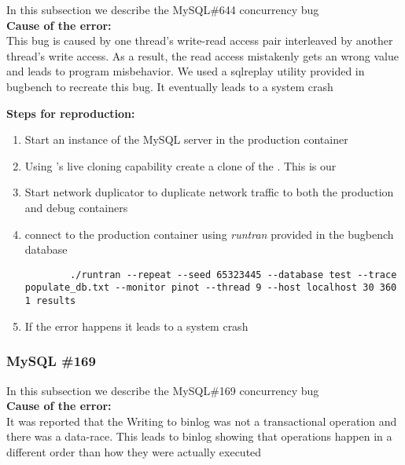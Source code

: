 In this subsection we describe the MySQL\#644 concurrency bug \\

\noindent \textbf{Cause of the error:} \\

This bug is caused by one thread's write-read access pair interleaved by another thread's write access. 
As a result, the read access mistakenly gets an wrong value and leads to program misbehavior.
We used a sqlreplay utility provided in bugbench to recreate this bug. It eventually leads to a system crash

\noindent \textbf{Steps for reproduction:} \\

\begin{adjustwidth}{0.5cm}{}
	\begin{enumerate}
		\item Start an instance of the MySQL server in the production container
		\item Using \parikshan's live cloning capability create a clone of the \productioncontainer. This is our \debugcontainer
		\item Start network duplicator to duplicate network traffic to both the production and debug containers
		\item connect to the production container using \emph{runtran} provided in the bugbench database
		
		\begin{lstlisting}
		./runtran --repeat --seed 65323445 --database test --trace populate_db.txt --monitor pinot --thread 9 --host localhost 30 360 1 results
		\end{lstlisting}
		
		\item If the error happens it leads to a system crash
		
	\end{enumerate}
\end{adjustwidth}	


\subsubsection{MySQL \#169}

In this subsection we describe the MySQL\#169 concurrency bug \\

\noindent \textbf{Cause of the error:} \\
It was reported that the Writing to binlog was not a transactional operation and there was a data-race. 
This leads to binlog showing that operations happen in a different order than how they were actually executed

